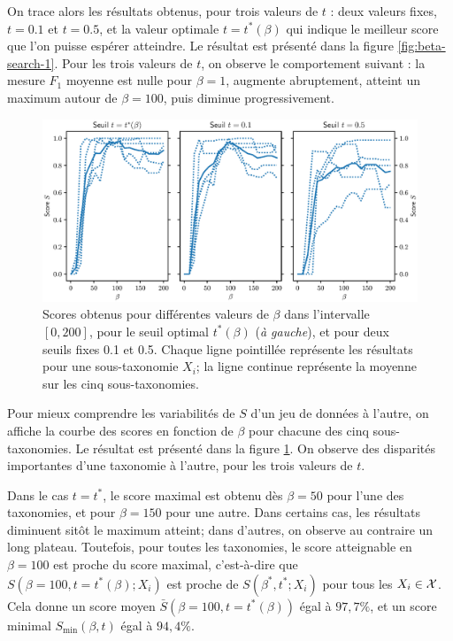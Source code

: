 On trace alors les résultats obtenus, pour trois valeurs de $t$ : deux valeurs fixes, $t = 0.1$ et $t = 0.5$, et la valeur optimale $t = t^*(\beta)$ qui indique le meilleur score que l'on puisse espérer atteindre. Le résultat est présenté dans la figure \ref{fig:beta-search-1}. Pour les trois valeurs de $t$, on observe le comportement suivant : la mesure $F_1$ moyenne est nulle pour $\beta = 1$, augmente abruptement, atteint un maximum autour de $\beta = 100$, puis diminue progressivement. 

\begin{figure}
    \centering
    \includegraphics[width=\textwidth]{fig/plot/average_beta_breakdown_all3_FR.eps}
    \caption[Scores selon $\beta$ sur cinq sous-taxonomies]{Scores obtenus pour différentes valeurs de $\beta$ dans l'intervalle $[0, 200]$, pour le seuil optimal $t^*(\beta)$ (\textit{à gauche}), et pour deux seuils fixes 0.1 et 0.5. Chaque ligne pointillée représente les résultats pour une sous-taxonomie $X_i$; la ligne continue représente la moyenne sur les cinq sous-taxonomies.}
    \label{fig:beta-search-3}
\end{figure}

Pour mieux comprendre les variabilités de $S$ d'un jeu de données à l'autre, on affiche la courbe des scores en fonction de $\beta$ pour chacune des cinq sous-taxonomies. Le résultat est présenté dans la figure \ref{fig:beta-search-3}. On observe des disparités importantes d'une taxonomie à l'autre, pour les trois valeurs de $t$. 

Dans le cas $t=t^*$, le score maximal est obtenu dès $\beta = 50$ pour l'une des taxonomies, et pour $\beta = 150$ pour une autre. Dans certains cas, les résultats diminuent sitôt le maximum atteint; dans d'autres, on observe au contraire un long plateau. Toutefois, pour toutes les taxonomies, le score atteignable en $\beta=100$ est proche du score maximal, c'est-à-dire que $S(\beta=100, t=t^*(\beta);X_i)$ est proche de $S(\beta^*, t^*; X_i)$ pour tous les $X_i \in \cal{X}$. Cela donne un score moyen $\bar{S}(\beta=100, t=t^*(\beta))$ égal à $97,7\%$, et un score minimal $S_{\min}(\beta, t)$ égal à $94,4\%$.

